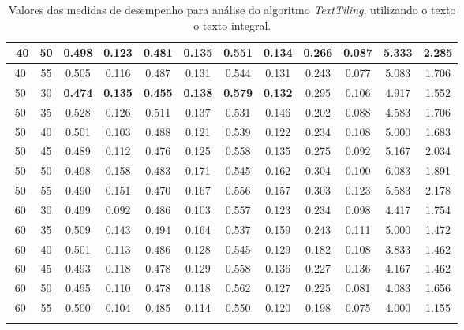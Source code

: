 \begin{longtable}[c]{|c|c|c|c|c|c|c|c|c|c|c|c|}
$$  40 & 50 & 0.498 & 0.123 & 0.481 & 0.135 & 0.551 & 0.134 & 0.266 & 0.087 & 5.333 & 2.285  \\ \hline 
  40 & 55 & 0.505 & 0.116 & 0.487 & 0.131 & 0.544 & 0.131 & 0.243 & 0.077 & 5.083 & 1.706  \\ \hline 
  50 & 30 & \cellcolor{gray!20} \textbf{0.474} & \cellcolor{gray!20} \textbf{0.135} & \cellcolor{gray!20} \textbf{0.455} & \cellcolor{gray!20} \textbf{0.138} & \cellcolor{gray!20} \textbf{0.579} & \cellcolor{gray!20} \textbf{0.132} & 0.295 & 0.106 & 4.917 & 1.552  \\ \hline 
  50 & 35 & 0.528 & 0.126 & 0.511 & 0.137 & 0.531 & 0.146 & 0.202 & 0.088 & 4.583 & 1.706  \\ \hline 
  50 & 40 & 0.501 & 0.103 & 0.488 & 0.121 & 0.539 & 0.122 & 0.234 & 0.108 & 5.000 & 1.683  \\ \hline 
  50 & 45 & 0.489 & 0.112 & 0.476 & 0.125 & 0.558 & 0.135 & 0.275 & 0.092 & 5.167 & 2.034  \\ \hline 
  50 & 50 & 0.498 & 0.158 & 0.483 & 0.171 & 0.545 & 0.162 & 0.304 & 0.100 & 6.083 & 1.891  \\ \hline 
  50 & 55 & 0.490 & 0.151 & 0.470 & 0.167 & 0.556 & 0.157 & 0.303 & 0.123 & 5.583 & 2.178  \\ \hline 
  60 & 30 & 0.499 & 0.092 & 0.486 & 0.103 & 0.557 & 0.123 & 0.234 & 0.098 & 4.417 & 1.754  \\ \hline 
  60 & 35 & 0.509 & 0.143 & 0.494 & 0.164 & 0.537 & 0.159 & 0.243 & 0.111 & 5.000 & 1.472  \\ \hline 
  60 & 40 & 0.501 & 0.113 & 0.486 & 0.128 & 0.545 & 0.129 & 0.182 & 0.108 & 3.833 & 1.462  \\ \hline 
  60 & 45 & 0.493 & 0.118 & 0.478 & 0.129 & 0.558 & 0.136 & 0.227 & 0.136 & 4.167 & 1.462  \\ \hline 
  60 & 50 & 0.495 & 0.110 & 0.478 & 0.118 & 0.562 & 0.127 & 0.225 & 0.081 & 4.083 & 1.656  \\ \hline 
  60 & 55 & 0.500 & 0.104 & 0.485 & 0.114 & 0.550 & 0.120 & 0.198 & 0.075 & 4.000 & 1.155  \\ \hline 
 \caption{Valores das medidas de desempenho para análise do algoritmo \textit{TextTiling}, utilizando o texto o texto integral.}
 \end{longtable} 


